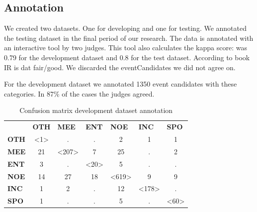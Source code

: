 \documentclass[
10pt, %
a4paper, %
oneside, %
headinclude,footinclude, %
BCOR5mm, %
]{scrartcl}
\begin{document}
\subsection{Annotation}
We created two datasets. One for developing and one for testing. We annotated the testing dataset in the final period of our research.
The data is annotated  with an interactive tool by two judges. This tool also calculates the kappa score: was 0.79 for the development dataset and 0.8 for the test dataset. According to book IR is dat fair/good. We discarded the eventCandidates we did not agree on.

For the development dataset we annotated 1350 event candidates with these categories. In 87\% of the cases the judges agreed.

\begin{table}[h]
\caption[Confusion matrix testset annotation]{Confusion matrix development dataset annotation }
\begin{tabular}{lcccccc}
 & \multicolumn{1}{l}{\textbf{OTH}} & \multicolumn{1}{l}{\textbf{MEE}} & \multicolumn{1}{l}{\textbf{ENT}} & \multicolumn{1}{l}{\textbf{NOE}} & \multicolumn{1}{l}{\textbf{INC}} & \multicolumn{1}{l}{\textbf{SPO}} \\ \cline{2-7} 
\multicolumn{1}{l|}{\textbf{OTH}} & \multicolumn{1}{c|}{\textless1\textgreater} & \multicolumn{1}{c|}{.} & \multicolumn{1}{c|}{.} & \multicolumn{1}{c|}{2} & \multicolumn{1}{c|}{1} & \multicolumn{1}{c|}{1} \\ \cline{2-7} 
\multicolumn{1}{l|}{\textbf{MEE}} & \multicolumn{1}{c|}{21} & \multicolumn{1}{c|}{\textless207\textgreater} & \multicolumn{1}{c|}{7} & \multicolumn{1}{c|}{25} & \multicolumn{1}{c|}{.} & \multicolumn{1}{c|}{2} \\ \cline{2-7} 
\multicolumn{1}{l|}{\textbf{ENT}} & \multicolumn{1}{c|}{3} & \multicolumn{1}{c|}{.} & \multicolumn{1}{c|}{\textless20\textgreater} & \multicolumn{1}{c|}{5} & \multicolumn{1}{c|}{.} & \multicolumn{1}{c|}{.} \\ \cline{2-7} 
\multicolumn{1}{l|}{\textbf{NOE}} & \multicolumn{1}{c|}{14} & \multicolumn{1}{c|}{27} & \multicolumn{1}{c|}{18} & \multicolumn{1}{c|}{\textless619\textgreater} & \multicolumn{1}{c|}{9} & \multicolumn{1}{c|}{9} \\ \cline{2-7} 
\multicolumn{1}{l|}{\textbf{INC}} & \multicolumn{1}{c|}{1} & \multicolumn{1}{c|}{2} & \multicolumn{1}{c|}{.} & \multicolumn{1}{c|}{12} & \multicolumn{1}{c|}{\textless178\textgreater} & \multicolumn{1}{c|}{.} \\ \cline{2-7} 
\multicolumn{1}{l|}{\textbf{SPO}} & \multicolumn{1}{c|}{1} & \multicolumn{1}{c|}{.} & \multicolumn{1}{c|}{.} & \multicolumn{1}{c|}{5} & \multicolumn{1}{c|}{.} & \multicolumn{1}{c|}{\textless60\textgreater} \\ \cline{2-7} 
\end{tabular}

\end{table}
\end{document}
